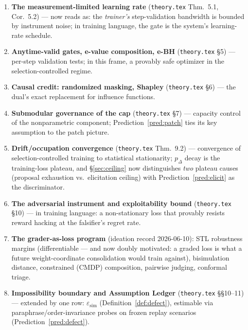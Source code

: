 \documentclass[11pt]{article}
\theoremstyle{plain}
\theoremstyle{definition}
\theoremstyle{remark}
\begin{document}
\begin{enumerate}[leftmargin=2em]
  \item \textbf{The measurement-limited learning rate}
        (\texttt{theory.tex} Thm.~5.1, Cor.~5.2) --- now reads as: the
        \emph{trainer's} step-validation bandwidth is bounded by instrument
        noise; in training language, the gate is the system's
        learning-rate schedule.
  \item \textbf{Anytime-valid gates, e-value composition, e-BH}
        (\texttt{theory.tex} \S5) --- per-step validation tests; in this
        frame, a provably safe optimizer in the selection-controlled
        regime.
  \item \textbf{Causal credit: randomized masking, Shapley}
        (\texttt{theory.tex} \S6) --- the dual's exact replacement for
        influence functions.
  \item \textbf{Submodular governance of the cap}
        (\texttt{theory.tex} \S7) --- capacity control of the nonparametric
        component; Prediction~\ref{pred:patch} ties its key assumption to
        the patch picture.
  \item \textbf{Drift/occupation convergence} (\texttt{theory.tex}
        Thm.~9.2) --- convergence of selection-controlled training to
        statistical stationarity; $p_\Delta$ decay is the training-loss
        plateau, and \S\ref{sec:ceiling} now distinguishes \emph{two}
        plateau causes (proposal exhaustion vs.\ elicitation ceiling) with
        Prediction~\ref{pred:elicit} as the discriminator.
  \item \textbf{The adversarial instrument and exploitability bound}
        (\texttt{theory.tex} \S10) --- in training language: a
        non-stationary loss that provably resists reward hacking at the
        falsifier's regret rate.
  \item \textbf{The grader-as-loss program} (ideation record
        2026-06-10): STL robustness margins (differentiable --- and now
        doubly motivated: a graded loss is what a future weight-coordinate
        consolidation would train against), bisimulation distance,
        constrained (CMDP) composition, pairwise judging, conformal triage.
  \item \textbf{Impossibility boundary and Assumption Ledger}
        (\texttt{theory.tex} \S\S10--11) --- extended by one row:
        $\varepsilon_{\mathrm{sim}}$ (Definition~\ref{def:defect}),
        estimable via paraphrase/order-invariance probes on frozen replay
        scenarios (Prediction~\ref{pred:defect}).
\end{enumerate}
\end{document}
